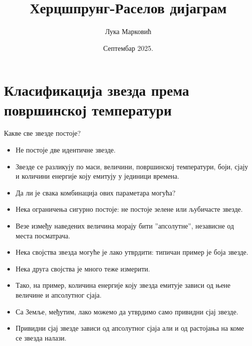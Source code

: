 \documentclass[aspectratio=169, xcolor=table, 10pt]{beamer}
\title{Херцшпрунг-Раселов дијаграм}
\author{Лука Марковић}
\institute[МАТФ]{Математички факултет Универзитета у Београду}
\date{Септембар 2025.}
\theoremstyle{definition}
\begin{document}
\maketitle

\section{Класификација звезда према површинској температури}

\begin{frame}{Какве све звезде постоје?}
  \begin{itemize}
    \item Не постоје две идентичне звезде.
    \item Звезде се разликују по маси, величини, површинској температури, боји, сјају и количини енергије коју емитују у јединици времена.
    \item Да ли је свака комбинација ових параметара могућа?
    \item Нека ограничења сигурно постоје: не постоје зелене или љубичасте звезде.
    \item Везе између наведених величина морају бити ”апсолутне”, независне од места посматрача.
    \item Нека својства звезда могуће је лако утврдити: типичан пример је боја звезде.
    \item Нека друга својства је много теже измерити.
    \item Тако, на пример, количина енергије коју звезда емитује зависи од њене величине и апсолутног сјаја.
    \item Са Земље, међутим, лако можемо да утврдимо само привидни сјај звезде.
    \item Привидни сјај звезде зависи од апсолутног сјаја али и од растојања на коме се звезда налази.
  \end{itemize}
\end{frame}
\end{document}
